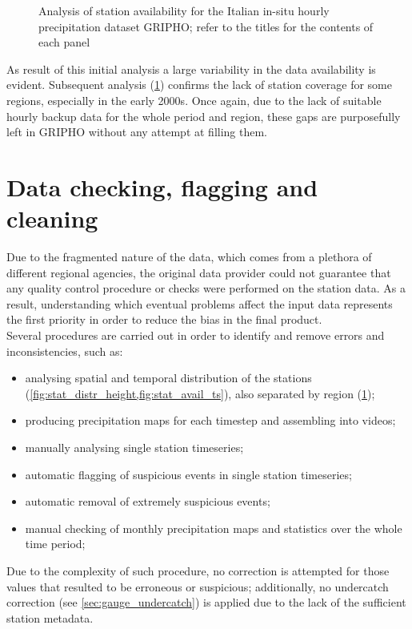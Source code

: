 \begin{figure}
\begin{subfigure}{.475\textwidth}
    \end{subfigure}
    \decoRule
    \caption[Analysis of station availability for the Italian in-situ hourly precipitation dataset GRIPHO]{Analysis of station availability for the Italian in-situ hourly precipitation dataset GRIPHO; refer to the titles for the contents of each panel} \label{fig:regional_stats}
\end{figure}

As result of this initial analysis a large variability in the data availability is evident. Subsequent analysis (\cref{sec:data_cleaning}) confirms the lack of station coverage for some regions, especially in the early 2000s. Once again, due to the lack of suitable hourly backup data for the whole period and region, these gaps are purposefully left in GRIPHO without any attempt at filling them.

\section{Data checking, flagging and cleaning} \label{sec:data_cleaning}
Due to the fragmented nature of the data, which comes from a plethora of different regional agencies, the original data provider could not guarantee that any quality control procedure or checks were performed on the station data.
As a result, understanding which eventual problems affect the input data represents the first priority in order to reduce the bias in the final product.\\ %
Several procedures are carried out in order to identify and remove errors and inconsistencies, such as:
\begin{itemize}
    \item analysing spatial and temporal distribution of the stations (\cref{fig:stat_distr_height,fig:stat_avail_ts}), also separated by region (\cref{fig:regional_stats});
    \item producing precipitation maps for each timestep and assembling into videos;
    \item manually analysing single station timeseries;
    \item automatic flagging of suspicious events in single station timeseries;
    \item automatic removal of extremely suspicious events;
    \item manual checking of monthly precipitation maps and statistics over the whole time period;
\end{itemize}
Due to the complexity of such procedure, no correction is attempted for those values that resulted to be erroneous or suspicious; additionally, no undercatch correction (see \cref{sec:gauge_undercatch}) is applied due to the lack of the sufficient station metadata.


